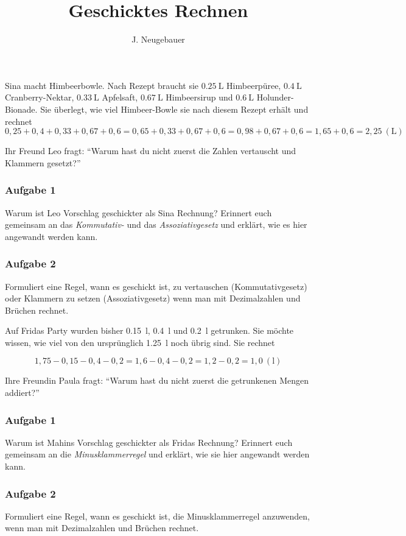 \documentclass[10pt, a5paper, landscape]{scrartcl}
\author{J. Neugebauer}
\title{Geschicktes Rechnen}
\date{\Heute}
\begin{document}
\ReiheTitel

Sina macht Himbeerbowle. Nach Rezept braucht sie $\SI{0,25}{\liter}$ Himbeerpüree, $\SI{0,4}{\liter}$ Cranberry-Nektar, $\SI{0,33}{\liter}$ Apfelsaft, $\SI{0,67}{\liter}$ Himbeersirup und $\SI{0,6}{\liter}$ Holunder-Bionade. Sie überlegt, wie viel Himbeer-Bowle sie nach diesem Rezept erhält und rechnet 
\[ 0,25 + 0,4 + 0,33 + 0,67 + 0,6 = 0,65 + 0,33 + 0,67 + 0,6 = 0,98 + 0,67 + 0,6 = 1,65 + 0,6 = 2,25\ (\si{\liter}) \]

Ihr Freund Leo fragt: \enquote{Warum hast du nicht zuerst die Zahlen vertauscht und Klammern gesetzt?}

\subsubsection*{Aufgabe 1}
Warum ist Leo Vorschlag geschickter als Sina Rechnung? Erinnert euch gemeinsam an das \emph{Kommutativ-} und das \emph{Assoziativgesetz} und erklärt, wie es hier angewandt werden kann.

\subsubsection*{Aufgabe 2}
Formuliert eine Regel, wann es geschickt ist, zu vertauschen (Kommutativgesetz) oder Klammern zu setzen (Assoziativgesetz) wenn man mit Dezimalzahlen und Brüchen rechnet.

\clearpage
\ReiheTitel

Auf Fridas Party wurden bisher \SI{0,15}{\litre}, \SI{0,4}{\litre} und \SI{0,2}{\litre} getrunken. Sie möchte wissen, wie viel von den ursprünglich \SI{1,25}{\litre} noch übrig sind. Sie rechnet

\[ 1,75 - 0,15 - 0,4 - 0,2 = 1,6 - 0,4 - 0,2 = 1,2 - 0,2 = 1,0\ (\si{\litre}) \]

Ihre Freundin Paula fragt: \enquote{Warum hast du nicht zuerst die getrunkenen Mengen addiert?}

\subsubsection*{Aufgabe 1}
Warum ist Mahins Vorschlag geschickter als Fridas Rechnung? Erinnert euch gemeinsam an die  \emph{Minusklammerregel} und erklärt, wie sie hier angewandt werden kann.

\subsubsection*{Aufgabe 2}
Formuliert eine Regel, wann es geschickt ist, die Minusklammerregel anzuwenden, wenn man mit Dezimalzahlen und Brüchen rechnet.
\end{document}
